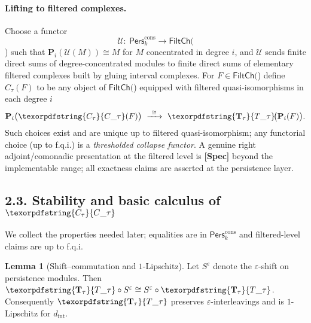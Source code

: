 \documentclass[11pt]{article}
\numberwithin{equation}{section}
\theoremstyle{plain}
\theoremstyle{definition}
\theoremstyle{remark}
\newcommand{\Pers}{\mathsf{Pers}}
\theoremstyle{plain}
\theoremstyle{definition}
\numberwithin{equation}{section}
\newtheorem{lemma}[theorem]{Lemma}
\theoremstyle{definition}
\DeclareRobustCommand{\FiltCh}[1]{\mathsf{FiltCh}(#1)}
\DeclareRobustCommand{\Ttau}{\texorpdfstring{\ensuremath{\mathbf{T}_{\tau}}}{T\_\tau}}
\DeclareRobustCommand{\Ctau}{\texorpdfstring{\ensuremath{C_{\tau}}}{C\_\tau}}
\numberwithin{equation}{section}
\theoremstyle{plain}
\theoremstyle{definition}
\theoremstyle{remark}
\newcommand{\Perscons}{\Pers^{\mathrm{cons}}_k}
\newcommand{\intdist}{d_{\mathrm{int}}}
\providecommand{\Cfun}[1]{\mathsf{C}_{#1}}
\providecommand{\Tfun}[1]{\mathbf{T}_{#1}}
\providecommand{\Ctau}{\Cfun{\tau}}
\providecommand{\Ttau}{\Tfun{\tau}}
\providecommand{\intdist}{d_{\mathrm{int}}}  %
\begin{document}
\paragraph{Lifting to filtered complexes.}
Choose a functor
\[
\mathcal{U}:\ \Perscons\longrightarrow \FiltCh
\]
such that \(\mathbf{P}_i(\mathcal{U}(M))\cong M\) for \(M\) concentrated in degree \(i\), and \(\mathcal{U}\) sends finite direct sums of degree-concentrated modules to finite direct sums of elementary filtered complexes built by gluing interval complexes. For \(F\in \FiltCh\) define \(C_\tau(F)\) to be any object of \(\FiltCh\) equipped with filtered quasi-isomorphisms in each degree \(i\)
\[
\mathbf{P}_i\big(\Ctau(F)\big)\ \xrightarrow{\ \cong\ }\ \Ttau\!\big(\mathbf{P}_i(F)\big).
\]
Such choices exist and are unique up to filtered quasi-isomorphism; any functorial choice (up to f.q.i.) is a \emph{thresholded collapse functor}. A genuine right adjoint/comonadic presentation at the filtered level is \textbf{[Spec]} beyond the implementable range; all exactness claims are asserted at the persistence layer.

\subsection*{2.3. Stability and basic calculus of \texorpdfstring{$\Ctau$}{C\_\texttau}}
We collect the properties needed later; equalities are in \(\Perscons\) and filtered-level claims are up to f.q.i.

\begin{lemma}[Shift–commutation and \(1\)-Lipschitz]\label{lem:shift}
Let \(S^\varepsilon\) denote the \(\varepsilon\)-shift on persistence modules. Then \(\Ttau\circ S^\varepsilon\cong S^\varepsilon\circ \Ttau\). Consequently \(\Ttau\) preserves \(\varepsilon\)-interleavings and is \(1\)-Lipschitz for \(\intdist\).
\end{lemma}
\end{document}
